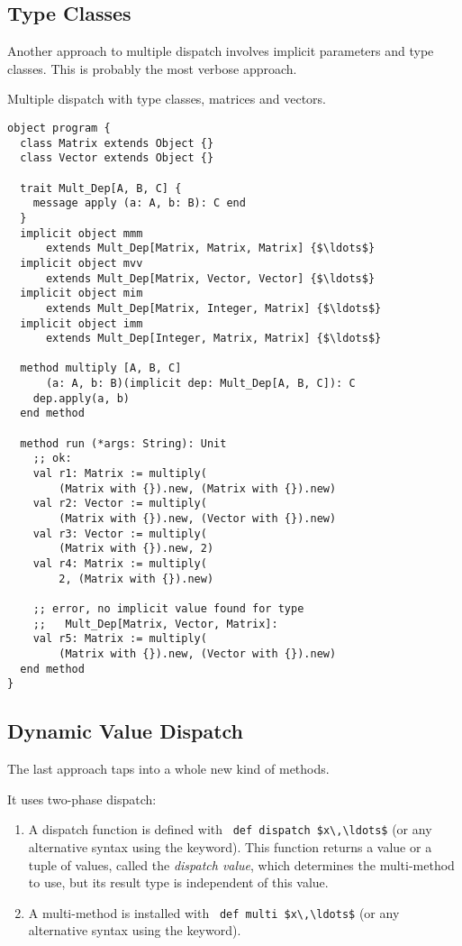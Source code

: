 \subsection{Type Classes}

Another approach to multiple dispatch involves implicit parameters and type classes. This is probably the most verbose approach. 

\example Multiple dispatch with type classes, matrices and vectors. 
\begin{lstlisting}
object program {
  class Matrix extends Object {}
  class Vector extends Object {}
  
  trait Mult_Dep[A, B, C] {
    message apply (a: A, b: B): C end
  }
  implicit object mmm 
      extends Mult_Dep[Matrix, Matrix, Matrix] {$\ldots$}
  implicit object mvv 
      extends Mult_Dep[Matrix, Vector, Vector] {$\ldots$}
  implicit object mim 
      extends Mult_Dep[Matrix, Integer, Matrix] {$\ldots$}
  implicit object imm 
      extends Mult_Dep[Integer, Matrix, Matrix] {$\ldots$}
  
  method multiply [A, B, C]
      (a: A, b: B)(implicit dep: Mult_Dep[A, B, C]): C
    dep.apply(a, b)
  end method
  
  method run (*args: String): Unit
    ;; ok:
    val r1: Matrix := multiply(
        (Matrix with {}).new, (Matrix with {}).new)
    val r2: Vector := multiply(
        (Matrix with {}).new, (Vector with {}).new)
    val r3: Vector := multiply(
        (Matrix with {}).new, 2)
    val r4: Matrix := multiply(
        2, (Matrix with {}).new)
    
    ;; error, no implicit value found for type
    ;;   Mult_Dep[Matrix, Vector, Matrix]:
    val r5: Matrix := multiply(
        (Matrix with {}).new, (Vector with {}).new)
  end method
}
\end{lstlisting}





\subsection{Dynamic Value Dispatch}
\label{sec:dynamic-value-dispatch}

The last approach taps into a whole new kind of methods. 

It uses two-phase dispatch:
\begin{enumerate}
  \item A dispatch function is defined with ~\lstinline!def dispatch $x\,\ldots$! (or any alternative syntax using the  keyword). This function returns a value or a tuple of values, called the {\em dispatch value}, which determines the multi-method to use, but its result type is independent of this value. 
  \item A multi-method is installed with ~\lstinline!def multi $x\,\ldots$! (or any alternative syntax using the  keyword).
\end{enumerate}


